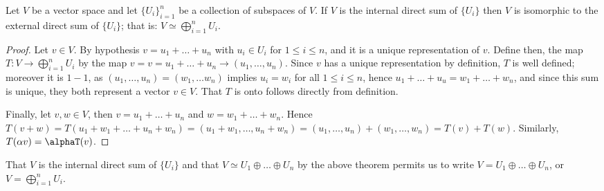 \begin{theorem}\label{1.1.7}
    Let $V$ be a vector space and let  $\{U_i\}_{i=1}^n$ be a collection of
    subspaces of $V$. If $V$ is the internal direct sum of  $\{U_i\}$ then $V$
    is isomorphic to the external direct sum of  $\{U_i\}$; that is: $V
    \simeq \bigoplus_{i=1}^n{U_i}$.
\end{theorem}
\begin{proof}
    Let $v \in V$. By hypothesis $v=u_1+\dots+u_n$ with $u_i \in U_i$ for  $1
    \leq i \leq n$, and it is a unique representation of  $v$. Define then, the
    map  $T:V \rightarrow \bigoplus_{i=1}^n{U_i}$ by the map $v=v=u_1+\dots+u_n
    \rightarrow (u_1, \dots, u_n)$. Since $v$ has a unique representation by
    definition,  $T$ is well defined; moreover it is $1-1$, as $(u_1, \dots,
    u_n)=(w_1, \dots w_n)$ implies $u_i=w_i$ for all  $1 \leq i \leq n$, hence
    $ u_1+\dots+u_u=w_1+\dots+w_n$, and since this sum is unique, they both
    represent a vector $v \in V$. That  $T$ is onto follows directly from
    definition.

    Finally, let  $v,w \in V$, then  $v=u_1+\dots+u_n$ and $w=w_1+\dots+w_n$.
    Hence $T(v+w)=T(u_1+w_1+\dots+u_n+w_n)=(u_1+w_1, \dots, u_n+w_n)=(u_1,
    \dots, u_n)+(w_1, \dots, w_n)=T(v)+T(w)$. Similarly, $T(\alpha
    v)=\alphaT(v)$.
\end{proof}
\begin{remark} 
    That $V$ is the internal direct sum of  $\{U_i\}$ and that $V \simeq U_1 \oplus
    \dots \oplus U_n$ by the above theorem permits us to write $V=U_1 \oplus
    \dots \oplus U_n$, or $V=\bigoplus_{i=1}^n{U_i}$.
\end{remark}
